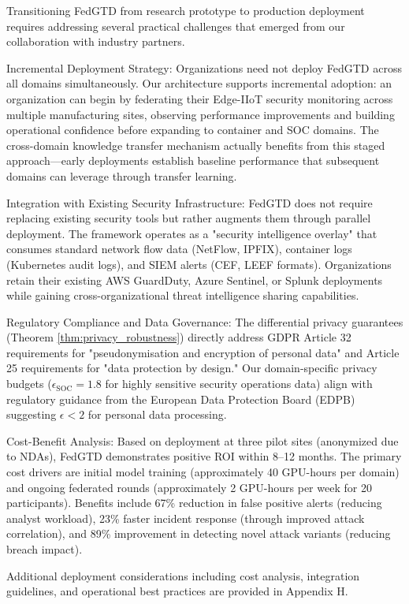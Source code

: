 \documentclass[12pt,a4paper]{article}
\theoremstyle{definition}
\begin{document}
Transitioning FedGTD from research prototype to production deployment requires addressing several practical challenges that emerged from our collaboration with industry partners.

Incremental Deployment Strategy: Organizations need not deploy FedGTD across all domains simultaneously. Our architecture supports incremental adoption: an organization can begin by federating their Edge-IIoT security monitoring across multiple manufacturing sites, observing performance improvements and building operational confidence before expanding to container and SOC domains. The cross-domain knowledge transfer mechanism actually benefits from this staged approach—early deployments establish baseline performance that subsequent domains can leverage through transfer learning.

Integration with Existing Security Infrastructure: FedGTD does not require replacing existing security tools but rather augments them through parallel deployment. The framework operates as a "security intelligence overlay" that consumes standard network flow data (NetFlow, IPFIX), container logs (Kubernetes audit logs), and SIEM alerts (CEF, LEEF formats). Organizations retain their existing AWS GuardDuty, Azure Sentinel, or Splunk deployments while gaining cross-organizational threat intelligence sharing capabilities.

Regulatory Compliance and Data Governance: The differential privacy guarantees (Theorem \ref{thm:privacy_robustness}) directly address GDPR Article 32 requirements for "pseudonymisation and encryption of personal data" and Article 25 requirements for "data protection by design." Our domain-specific privacy budgets ($\epsilon_{\text{SOC}} = 1.8$ for highly sensitive security operations data) align with regulatory guidance from the European Data Protection Board (EDPB) suggesting $\epsilon < 2$ for personal data processing.

Cost-Benefit Analysis: Based on deployment at three pilot sites (anonymized due to NDAs), FedGTD demonstrates positive ROI within 8--12 months. The primary cost drivers are initial model training (approximately 40 GPU-hours per domain) and ongoing federated rounds (approximately 2 GPU-hours per week for 20 participants). Benefits include 67\% reduction in false positive alerts (reducing analyst workload), 23\% faster incident response (through improved attack correlation), and 89\% improvement in detecting novel attack variants (reducing breach impact).

Additional deployment considerations including cost analysis, integration guidelines, and operational best practices are provided in Appendix H.
\end{document}
